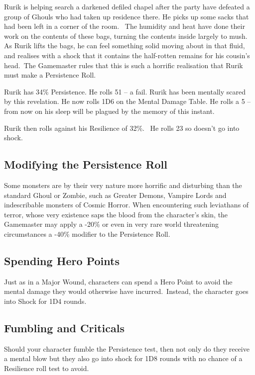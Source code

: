 \begin{rpg-examplebox}
Rurik is helping search a darkened defiled chapel after the party have defeated a group of Ghouls who had taken up residence there. He picks up some sacks that had been left in a corner of the room.  The humidity and heat have done their work on the contents of these bags, turning the contents inside largely to mush. As Rurik lifts the bags, he can feel something solid moving about in that fluid, and realises with a shock that it contains the half-rotten remains for his cousin's head. The Gamemaster rules that this is such a horrific realisation that Rurik must make a Persistence Roll.  

Rurik has 34\% Persistence. He rolls 51 – a fail. Rurik has been mentally scared by this revelation. He now rolls 1D6 on the Mental Damage Table. He rolls a 5 – from now on his sleep will be plagued by the memory of this instant.  

Rurik then rolls against his Resilience of 32\%.  He rolls 23 so doesn’t go into shock.  
\end{rpg-examplebox}

\subsection{Modifying the Persistence Roll}
Some monsters are by their very nature more horrific and disturbing than the standard Ghoul or Zombie, such as Greater Demons, Vampire Lords and indescribable monsters of Cosmic Horror. When encountering such leviathans of terror, whose very existence saps the blood from the character’s skin, the Gamemaster may apply a -20\% or even in very rare world threatening circumstances a -40\% modifier to the Persistence Roll.


\subsection{Spending Hero Points}
Just as in a Major Wound, characters can spend a Hero Point to avoid the mental damage they would otherwise have incurred. Instead, the character goes into Shock for 1D4 rounds.


\subsection{Fumbling and Criticals}
Should your character fumble the Persistence test, then not only do they receive a mental blow but they also go into shock for 1D8 rounds with no chance of a Resilience roll test to avoid.

